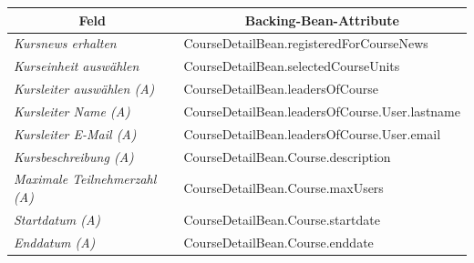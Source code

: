 \begin{itemize}
\begin{center}
\begin{longtable}{|p{3cm} |p{9cm} |}
						\hline \multicolumn{1}{|c|}{\textbf{Feld}} & \multicolumn{1}{|c|}{\textbf{Backing-Bean-Attribute}}\\ \hline
						\endfirsthead
						\hline
						\endlastfoot
						\textit{Kursnews erhalten} & CourseDetailBean.registeredForCourseNews\\ \hline
						\textit{Kurseinheit auswählen} & CourseDetailBean.selectedCourseUnits\\ \hline
						\textit{Kursleiter auswählen (A)} & CourseDetailBean.leadersOfCourse\\ \hline
						\textit{Kursleiter Name (A)} & CourseDetailBean.leadersOfCourse.User.lastname\\ \hline
						\textit{Kursleiter E-Mail (A)} & CourseDetailBean.leadersOfCourse.User.email\\ \hline
						\textit{Kursbeschreibung (A)} & CourseDetailBean.Course.description\\ \hline
						\textit{Maximale Teilnehmerzahl (A)} & CourseDetailBean.Course.maxUsers\\ \hline
						\textit{Startdatum (A)} & CourseDetailBean.Course.startdate\\ \hline
						\textit{Enddatum (A)} & CourseDetailBean.Course.enddate\\ \hline
					\end{longtable}
					\begin{longtable}{|p{3cm} |p{4cm} | p{4cm}|p{3cm} ||}
						

\end{longtable}
\end{center}
\end{itemize}
